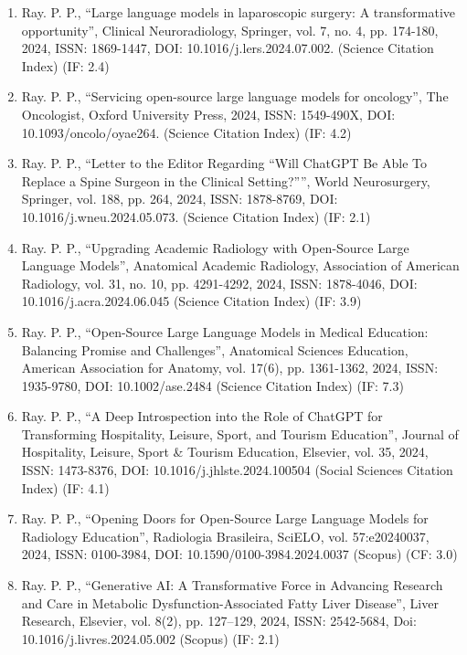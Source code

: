 \documentclass[11pt,a4paper]{moderncv}
\begin{document}
\begin{adjustwidth}{6em}{0pt}
\begin{enumerate}
		\item Ray. P. P., “Large language models in laparoscopic surgery: A transformative opportunity”, Clinical Neuroradiology, Springer, vol. 7, no. 4, pp. 174-180, 2024, ISSN: 1869-1447, DOI: 10.1016/j.lers.2024.07.002. (Science Citation Index) (IF: 2.4)
		
		\item Ray. P. P., “Servicing open-source large language models for oncology”, The Oncologist, Oxford University Press, 2024, ISSN: 1549-490X, DOI: 10.1093/oncolo/oyae264. (Science Citation Index) (IF: 4.2)
		
		\item Ray. P. P., “Letter to the Editor Regarding “Will ChatGPT Be Able To Replace a Spine Surgeon in the Clinical Setting?””, World Neurosurgery, Springer, vol. 188, pp. 264, 2024, ISSN: 1878-8769, DOI: 10.1016/j.wneu.2024.05.073. (Science Citation Index) (IF: 2.1)
		
		\item Ray. P. P., “Upgrading Academic Radiology with Open-Source Large Language Models”, Anatomical Academic Radiology, Association of American Radiology, vol. 31, no. 10, pp. 4291-4292, 2024, ISSN: 1878-4046, DOI: 10.1016/j.acra.2024.06.045 (Science Citation Index) (IF: 3.9)
		
		\item Ray. P. P., “Open-Source Large Language Models in Medical Education: Balancing Promise and Challenges”, Anatomical Sciences Education, American Association for Anatomy, vol. 17(6), pp. 1361-1362, 2024, ISSN: 1935-9780, DOI: 10.1002/ase.2484 (Science Citation Index) (IF: 7.3)
		
		\item Ray. P. P., “A Deep Introspection into the Role of ChatGPT for Transforming Hospitality, Leisure, Sport, and Tourism Education”, Journal of Hospitality, Leisure, Sport \& Tourism Education, Elsevier, vol. 35, 2024, ISSN: 1473-8376, DOI: 10.1016/j.jhlste.2024.100504 (Social Sciences Citation Index) (IF: 4.1)
		
		\item Ray. P. P., “Opening Doors for Open-Source Large Language Models for Radiology Education”, Radiologia Brasileira, SciELO, vol. 57:e20240037, 2024, ISSN: 0100-3984, DOI: 10.1590/0100-3984.2024.0037 (Scopus) (CF: 3.0)
		
		\item Ray. P. P., “Generative AI: A Transformative Force in Advancing Research and Care in Metabolic Dysfunction-Associated Fatty Liver Disease”, Liver Research, Elsevier, vol. 8(2), pp. 127–129, 2024, ISSN: 2542-5684, Doi: 10.1016/j.livres.2024.05.002 (Scopus) (IF: 2.1)
		

\end{enumerate}
\end{adjustwidth}
\end{document}
